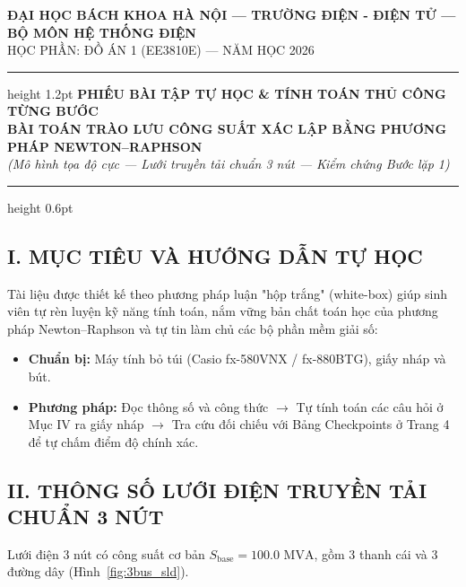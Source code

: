 \documentclass[10.5pt,a4paper]{article}
\begin{document}
\begin{center}
    {\fontsize{10}{12}\selectfont \textbf{ĐẠI HỌC BÁCH KHOA HÀ NỘI --- TRƯỜNG ĐIỆN - ĐIỆN TỬ --- BỘ MÔN HỆ THỐNG ĐIỆN}}\\[2pt]
    {\fontsize{9}{11}\selectfont HỌC PHẦN: ĐỒ ÁN 1 (EE3810E) --- NĂM HỌC 2026}\\[6pt]
    \hrule height 1.2pt
    \vspace{6pt}
    {\fontsize{13}{16}\selectfont \textcolor{hustblue}{\textbf{PHIẾU BÀI TẬP TỰ HỌC \& TÍNH TOÁN THỦ CÔNG TỪNG BƯỚC}}}\\[3pt]
    {\fontsize{11}{14}\selectfont \textbf{BÀI TOÁN TRÀO LƯU CÔNG SUẤT XÁC LẬP BẰNG PHƯƠNG PHÁP NEWTON--RAPHSON}}\\[2pt]
    {\fontsize{9.5}{12}\selectfont \textit{(Mô hình tọa độ cực --- Lưới truyền tải chuẩn 3 nút --- Kiểm chứng Bước lặp 1)}}\\[6pt]
    \hrule height 0.6pt
\end{center}

\vspace{-4pt}
\subsection*{I. MỤC TIÊU VÀ HƯỚNG DẪN TỰ HỌC}
\vspace{-4pt}
Tài liệu được thiết kế theo phương pháp luận "hộp trắng" (white-box) giúp sinh viên tự rèn luyện kỹ năng tính toán, nắm vững bản chất toán học của phương pháp Newton--Raphson và tự tin làm chủ các bộ phần mềm giải số:
\begin{itemize}\setlength{\itemsep}{1pt}\setlength{\parskip}{0pt}
    \item \textbf{Chuẩn bị:} Máy tính bỏ túi (Casio fx-580VNX / fx-880BTG), giấy nháp và bút.
    \item \textbf{Phương pháp:} Đọc thông số và công thức $\to$ Tự tính toán các câu hỏi ở Mục IV ra giấy nháp $\to$ Tra cứu đối chiếu với Bảng Checkpoints ở Trang 4 để tự chấm điểm độ chính xác.
\end{itemize}

\vspace{-4pt}
\subsection*{II. THÔNG SỐ LƯỚI ĐIỆN TRUYỀN TẢI CHUẨN 3 NÚT}
\vspace{-4pt}
Lưới điện 3 nút có công suất cơ bản $S_{\text{base}} = 100.0\text{ MVA}$, gồm 3 thanh cái và 3 đường dây (Hình~\ref{fig:3bus_sld}).
\end{document}
